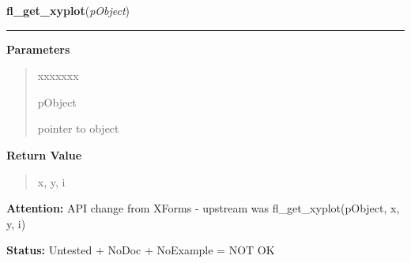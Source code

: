 \hspace{.8\funcindent}\begin{boxedminipage}{\funcwidth}

    \raggedright \textbf{fl\_get\_xyplot}(\textit{pObject})

    \vspace{-1.5ex}

    \rule{\textwidth}{0.5\fboxrule}
\setlength{\parskip}{2ex}
\setlength{\parskip}{1ex}
      \textbf{Parameters}
      \vspace{-1ex}

      \begin{quote}
        \begin{Ventry}{xxxxxxx}

          \item[pObject]

          pointer to object

        \end{Ventry}

      \end{quote}

      \textbf{Return Value}
    \vspace{-1ex}

      \begin{quote}
      x, y, i

      \end{quote}

\textbf{Attention:} API change from XForms - upstream was fl\_get\_xyplot(pObject, x, y, i)



\textbf{Status:} Untested + NoDoc + NoExample = NOT OK



    \end{boxedminipage}

    \label{xformslib:library:fl_get_xyplot_data}

    \vspace{0.5ex}

